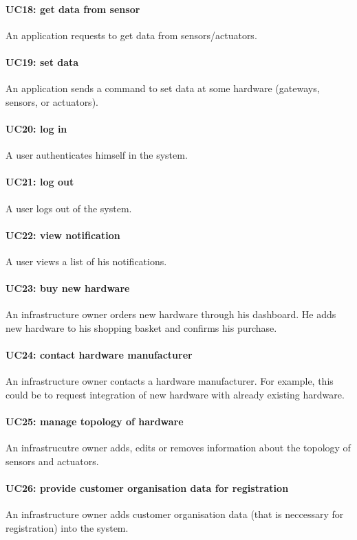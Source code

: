 \paragraph{UC18: get data from sensor}
An application requests to get data from sensors/actuators.
\paragraph{UC19: set data}
An application sends a command to set data at some hardware (gateways, sensors, or actuators).
\paragraph{UC20: log in}
A user authenticates himself in the system.
\paragraph{UC21: log out}
A user logs out of the system.
\paragraph{UC22: view notification}
A user views a list of his notifications.
\paragraph{UC23: buy new hardware}
An infrastructure owner orders new hardware through his dashboard. He adds new hardware
to his shopping basket and confirms his purchase.
\paragraph{UC24: contact hardware manufacturer}
An infrastructure owner contacts a hardware manufacturer. For example, this
could be to request integration of new hardware with already existing hardware.
\paragraph{UC25: manage topology of hardware}
An infrastrucutre owner adds, edits or removes information about the topology
of sensors and actuators.
\paragraph{UC26: provide customer organisation data for registration}
An infrastructure owner adds customer organisation data (that is neccessary
for registration) into the system.

